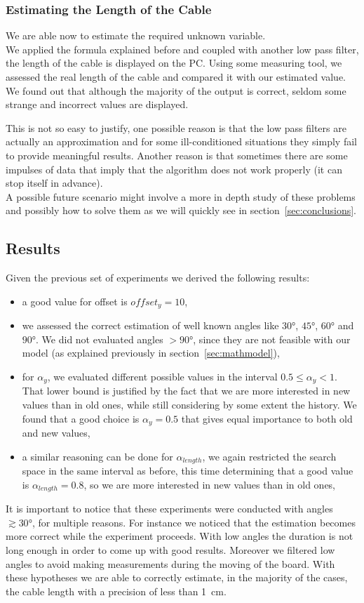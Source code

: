 \subsubsection{Estimating the Length of the Cable}
We are able now to estimate the required unknown variable. \\ We applied the formula explained before and coupled with another low pass filter, the length of the cable is displayed on the PC. Using some measuring tool, we assessed the real length of the cable and compared it with our estimated value. We found out that although the majority of the output is correct, seldom some strange and incorrect values are displayed. \par This is not so easy to justify, one possible reason is that the low pass filters are actually an approximation and for some ill-conditioned situations they simply fail to provide meaningful results. Another reason is that sometimes there are some impulses of data that imply that the algorithm does not work properly (it can stop itself in advance).\\
A possible future scenario might involve a more in depth study of these problems and possibly how to solve them as we will quickly see in section~\ref{sec:conclusions}.
\subsection{Results}
\label{sec:results}
Given the previous set of experiments we derived the following results:
\begin{itemize}
	\item a good value for offset is $offset_y = 10$,
	\item we assessed the correct estimation of well known angles like $30\si{\degree}$, $45\si{\degree}$, $60\si{\degree}$ and $90\si{\degree}$. We did not evaluated angles $> 90\si{\degree}$, since they are not feasible with our model (as explained previously in section~\ref{sec:mathmodel}),
	\item for $\alpha_y$, we evaluated different possible values in the interval $0.5 \leq \alpha_y < 1 $. That lower bound is justified by the fact that we are more interested in new values than in old ones, while still considering by some extent the history. We found that a good choice is $\alpha_y = 0.5$ that gives equal importance to both old and new values,
	\item a similar reasoning can be done for $\alpha_{length}$, we again restricted the search space in the same interval as before, this time determining that a good value is $\alpha_{length} = 0.8$, so we are more interested in new values than in old ones,
\end{itemize}
It is important to notice that these experiments were conducted with angles $\gtrsim 30\si{\degree}$, for multiple reasons. For instance we noticed that the estimation becomes more correct while the experiment proceeds. With low angles the duration is not long enough in order to come up with good results. Moreover we filtered low angles to avoid making measurements during the moving of the board.
With these hypotheses we are able to correctly estimate, in the majority of the cases, the cable length with a precision of less than \SI{1}{\cm}.
\pagebreak

